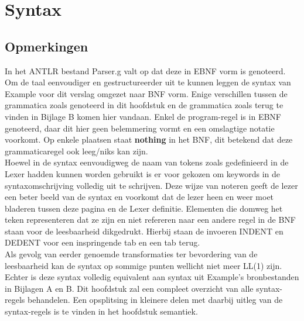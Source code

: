 \chapter{Syntax}
\section{Opmerkingen}
In het ANTLR bestand Parser.g valt op dat deze in EBNF vorm is genoteerd. Om de taal eenvoudiger en gestructureerder uit te kunnen leggen de syntax van Example voor dit verslag omgezet naar BNF vorm. Enige verschillen tussen de grammatica zoals genoteerd in dit hoofdstuk en de grammatica zoals terug te vinden in Bijlage B komen hier vandaan. Enkel de program-regel is in EBNF genoteerd, daar dit hier geen belemmering vormt en een omslagtige notatie voorkomt. Op enkele plaatsen staat \textbf{nothing} in het BNF, dit betekend dat deze grammaticaregel ook leeg/niks kan zijn.\\
 
Hoewel in de syntax eenvoudigweg de naam van tokens zoals gedefinieerd in de Lexer hadden kunnen worden gebruikt is er voor gekozen om keywords in de syntaxomschrijving volledig uit te schrijven. Deze wijze van noteren geeft de lezer een beter beeld van de syntax en voorkomt dat de lezer heen en weer moet bladeren tussen deze pagina en de Lexer definitie. Elementen die domweg het teken representeren dat ze zijn en niet refereren naar een andere regel in de BNF staan voor de leesbaarheid dikgedrukt. Hierbij staan de invoeren INDENT en DEDENT voor een inspringende tab en een tab terug.\\

Als gevolg van eerder genoemde transformaties ter bevordering van de leesbaarheid kan de syntax op sommige punten wellicht niet meer LL(1) zijn. Echter is deze syntax volledig equivalent aan syntax uit Example's bronbestanden in Bijlagen A en B. Dit hoofdstuk zal een compleet overzicht van alle syntax-regels behandelen. Een opsplitsing in kleinere delen met daarbij uitleg van de syntax-regels is te vinden in het hoofdstuk semantiek. 


